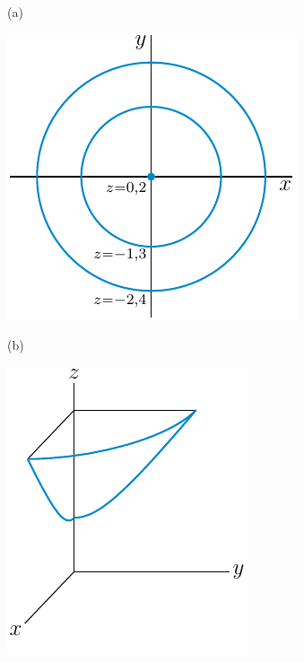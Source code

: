 \begin{answer}
(a)

\begin{center}
     \includegraphics{fig/OE253_11D_1a.pdf}
\end{center}

(b)

\begin{center}
   \includegraphics{fig/OE253_11D_1bl.pdf}\qquad\qquad
\end{center}
\end{answer}

